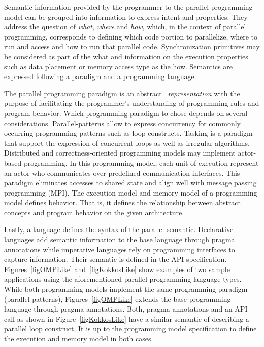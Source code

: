 Semantic information provided by the programmer to the parallel programming model can be grouped into information to express intent and properties. They address the question of \emph{what}, \emph{where} and \emph{how}, which, in the context of parallel programming, corresponds to defining which code portion to parallelize, where to run and access and how to run that parallel code. Synchronization primitives may be considered as part of the what and information on the execution properties such as data placement or memory access type as the how. Semantics are expressed following a paradigm and a programming language.

The parallel programming paradigm is an abstract ~\emph{representation} with the purpose of facilitating the programmer's understanding of programming rules and program behavior. Which programming paradigm to chose depends on several considerations. Parallel-patterns allow to express concurrency for commonly occurring programming patterns such as loop constructs. Tasking is a paradigm that support the expression of concurrent loops as well as irregular algorithms. Distributed and correctness-oriented programming models may implement actor-based programming. In this programming model, each unit of execution represent an actor who communicates over predefined communication interfaces. This paradigm eliminates accesses to shared state and align well with message passing programming (MPI). The execution model and memory model of a programming model defines behavior. That is, it defines the relationship between abstract concepts and program behavior on the given architecture.

Lastly, a language defines the syntax of the parallel semantic. Declarative languages add semantic information to the base language through pragma annotations while imperative languages rely on programming interfaces to capture information. Their semantic is defined in the API specification. Figures~\ref{figOMPLike} and~\ref{figKokkosLike} show examples of two sample applications using the aforementioned parallel programming language types. While both programming models implement the same programming paradigm (parallel patterns), Figures~\ref{figOMPLike} extends the base programming language through pragma annotations. Both, pragma annotations and an API call as shown in Figure~\ref{figKokkosLike} have a similar semantic of describing a parallel loop construct. It is up to the programming model specification to define the execution and memory model in both cases. 

